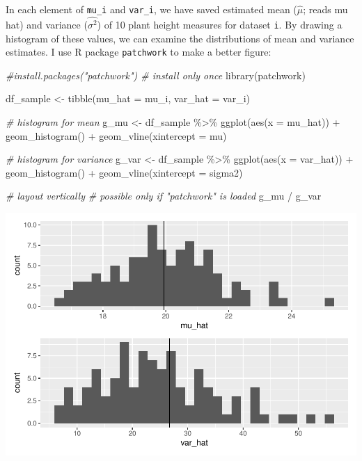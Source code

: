 \documentclass[
]{book}
\newenvironment{Shaded}{\begin{snugshade}}{\end{snugshade}}
\newcommand{\AttributeTok}[1]{\textcolor[rgb]{0.77,0.63,0.00}{#1}}
\newcommand{\CommentTok}[1]{\textcolor[rgb]{0.56,0.35,0.01}{\textit{#1}}}
\newcommand{\FunctionTok}[1]{\textcolor[rgb]{0.00,0.00,0.00}{#1}}
\newcommand{\NormalTok}[1]{#1}
\newcommand{\OtherTok}[1]{\textcolor[rgb]{0.56,0.35,0.01}{#1}}
\newcommand{\SpecialCharTok}[1]{\textcolor[rgb]{0.00,0.00,0.00}{#1}}
\begin{document}
In each element of \texttt{mu\_i} and \texttt{var\_i}, we have saved estimated mean (\(\hat{\mu}\); reads mu hat) and variance (\(\hat{\sigma^2}\)) of 10 plant height measures for dataset \texttt{i}. By drawing a histogram of these values, we can examine the distributions of mean and variance estimates. I use R package \texttt{patchwork} to make a better figure:

\begin{Shaded}
\begin{Highlighting}[]
\CommentTok{\#install.packages("patchwork") \# install only once}
\FunctionTok{library}\NormalTok{(patchwork)}

\NormalTok{df\_sample }\OtherTok{\textless{}{-}} \FunctionTok{tibble}\NormalTok{(}\AttributeTok{mu\_hat =}\NormalTok{ mu\_i, }\AttributeTok{var\_hat =}\NormalTok{ var\_i)}

\CommentTok{\# histogram for mean}
\NormalTok{g\_mu }\OtherTok{\textless{}{-}}\NormalTok{ df\_sample }\SpecialCharTok{\%\textgreater{}\%} 
  \FunctionTok{ggplot}\NormalTok{(}\FunctionTok{aes}\NormalTok{(}\AttributeTok{x =}\NormalTok{ mu\_hat)) }\SpecialCharTok{+}
  \FunctionTok{geom\_histogram}\NormalTok{() }\SpecialCharTok{+}
  \FunctionTok{geom\_vline}\NormalTok{(}\AttributeTok{xintercept =}\NormalTok{ mu)}

\CommentTok{\# histogram for variance}
\NormalTok{g\_var }\OtherTok{\textless{}{-}}\NormalTok{ df\_sample }\SpecialCharTok{\%\textgreater{}\%} 
  \FunctionTok{ggplot}\NormalTok{(}\FunctionTok{aes}\NormalTok{(}\AttributeTok{x =}\NormalTok{ var\_hat)) }\SpecialCharTok{+}
  \FunctionTok{geom\_histogram}\NormalTok{() }\SpecialCharTok{+}
  \FunctionTok{geom\_vline}\NormalTok{(}\AttributeTok{xintercept =}\NormalTok{ sigma2)}

\CommentTok{\# layout vertically}
\CommentTok{\# possible only if "patchwork" is loaded}
\NormalTok{g\_mu }\SpecialCharTok{/}\NormalTok{ g\_var}
\end{Highlighting}
\end{Shaded}

\begin{center}\includegraphics{_main_files/figure-latex/mu-var-dist-1} \end{center}
\end{document}
